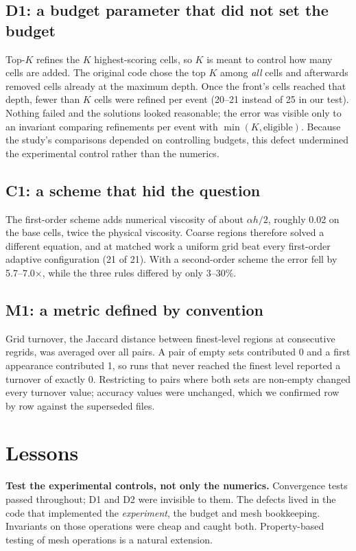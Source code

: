 \documentclass[conference]{IEEEtran}
\begin{document}
\subsection{D1: a budget parameter that did not set the budget}
Top-$K$ refines the $K$ highest-scoring cells, so $K$ is meant to control
how many cells are added. The original code chose the top $K$ among
\emph{all} cells and afterwards removed cells already at the maximum depth.
Once the front's cells reached that depth, fewer than $K$ cells were
refined per event (20--21 instead of 25 in our test). Nothing failed and
the solutions looked reasonable; the error was visible only to an invariant
comparing refinements per event with $\min(K,\text{eligible})$. Because the
study's comparisons depended on controlling budgets, this defect undermined
the experimental control rather than the numerics.

\subsection{C1: a scheme that hid the question}
The first-order scheme adds numerical viscosity of about $\alpha h/2$,
roughly 0.02 on the base cells, twice the physical viscosity. Coarse regions
therefore solved a different equation, and at matched work a uniform grid
beat every first-order adaptive configuration (21 of 21). With a
second-order scheme the error fell by 5.7--7.0$\times$, while the three
rules differed by only 3--30\%.

\subsection{M1: a metric defined by convention}
Grid turnover, the Jaccard distance between finest-level regions at
consecutive regrids, was averaged over all pairs. A pair of empty sets
contributed 0 and a first appearance contributed 1, so runs that never
reached the finest level reported a turnover of exactly 0. Restricting to
pairs where both sets are non-empty changed every turnover value; accuracy
values were unchanged, which we confirmed row by row against the superseded
files.

\section{Lessons}
\textbf{Test the experimental controls, not only the numerics.}
Convergence tests passed throughout; D1 and D2 were invisible to them. The
defects lived in the code that implemented the \emph{experiment}, the
budget and mesh bookkeeping. Invariants on those operations were cheap and
caught both. Property-based testing of mesh operations is a natural
extension.
\end{document}
